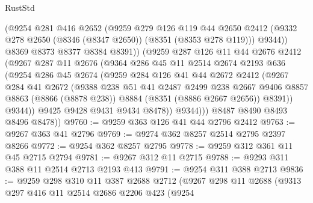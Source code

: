 \begin{lexlean}{RustStd}
\begin{coremodule}
                (@9254
                  @281
                  @416
                  @2652
                  (@9259
                    @279
                    @126
                    @119
                    @44
                    @2650
                    @2412
                    (@9332 @278 @2650 (@8346 (@8347 @2650)) (@8351 (@8353 @278 @119)))
                    @9344))
                @8369
                @8373
                @8377
                @8384
                @8391))
            (@9259
              @287
              @126
              @11
              @44
              @2676
              @2412
              (@9267
                @287
                @11
                @2676
                (@9364
                  @286
                  @45
                  @11
                  @2514
                  @2674
                  @2193
                  @636
                  (@9254
                    @286
                    @45
                    @2674
                    (@9259
                      @284
                      @126
                      @41
                      @44
                      @2672
                      @2412
                      (@9267
                        @284
                        @41
                        @2672
                        (@9388
                          @238
                          @51
                          @41
                          @2487
                          @2499
                          @238
                          @2667
                          @9406
                          @8857
                          @8863
                          (@8866 (@8878 @238))
                          @8884
                          (@8351 (@8886 @2667 @2656))
                          @8391))
                      @9344))
                  @9425
                  @9428
                  @9431
                  @9434
                  @8478))
              @9344)))
        @8487
        @8490
        @8493
        @8496
        @8478))
@9760 := @9259 @363 @126 @41 @44 @2796 @2412
@9763 := @9267 @363 @41 @2796
@9769 := @9274 @362 @8257 @2514 @2795 @2397 @8266
@9772 := @9254 @362 @8257 @2795
@9778 := @9259 @312 @361 @11 @45 @2715 @2794
@9781 := @9267 @312 @11 @2715
@9788 := @9293 @311 @388 @11 @2514 @2713 @2193 @413
@9791 := @9254 @311 @388 @2713
@9836 := @9259
    @298
    @310
    @11
    @387
    @2688
    @2712
    (@9267
      @298
      @11
      @2688
      (@9313
        @297
        @416
        @11
        @2514
        @2686
        @2206
        @423
        (@9254

\end{coremodule}
\end{lexlean}
